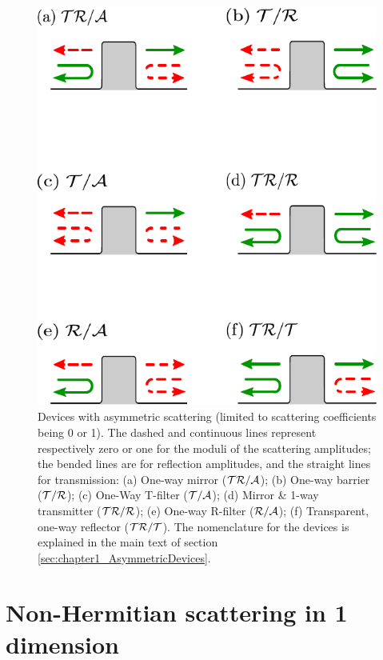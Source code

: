 \begin{figure}
  \center
  \includegraphics[width = 0.5\linewidth]{Figures/PotentialCasesPT.pdf}
  \caption{Devices with asymmetric scattering (limited to scattering coefficients being 0 or 1).  The dashed and continuous lines represent respectively zero or one
  for the moduli of the scattering amplitudes; the bended lines are for reflection amplitudes, and the straight lines for transmission:
  (a) One-way mirror ($\cal{TR/A}$); (b) One-way barrier ($\cal{T/R}$); (c) One-Way T-filter ($\cal{T/A}$);
  (d) Mirror \& 1-way transmitter ($\cal{TR/R}$); (e) One-way R-filter ($\cal{R/A}$); (f) Transparent, one-way
  reflector ($\cal{TR/T}$). The nomenclature for the devices is explained in the main text of section \ref{sec:chapter1_AsymmetricDevices}.
  \label{fig:chapter1_cases}}
\end{figure}

\section{Non-Hermitian scattering in 1 dimension \label{sec:chapter1_ScattFormalism}}


